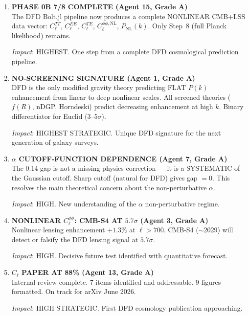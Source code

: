 \documentclass[11pt,a4paper]{article}
\begin{document}
\begin{enumerate}[label=\textbf{\arabic*.}, leftmargin=1.5cm]

\item \textbf{PHASE 0B 7/8 COMPLETE (Agent 15, Grade A)}\\
The DFD Bolt.jl pipeline now produces a complete NONLINEAR CMB+LSS data vector: $C_\ell^{TT}$, $C_\ell^{EE}$, $C_\ell^{TE}$, $C_\ell^{\phi\phi,\mathrm{NL}}$, $P_{\mathrm{NL}}(k)$. Only Step~8 (full Planck likelihood) remains.

\textit{Impact}: HIGHEST. One step from a complete DFD cosmological prediction pipeline.

\item \textbf{NO-SCREENING SIGNATURE (Agent 1, Grade A)}\\
DFD is the only modified gravity theory predicting FLAT $P(k)$ enhancement from linear to deep nonlinear scales. All screened theories ($f(R)$, nDGP, Horndeski) predict decreasing enhancement at high $k$. Binary differentiator for Euclid ($3$--$5\sigma$).

\textit{Impact}: HIGHEST STRATEGIC. Unique DFD signature for the next generation of galaxy surveys.

\item \textbf{$\alpha$ CUTOFF-FUNCTION DEPENDENCE (Agent 7, Grade A)}\\
The 0.14 gap is not a missing physics correction --- it is a SYSTEMATIC of the Gaussian cutoff. Sharp cutoff (natural for DFD) gives gap $= 0$. This resolves the main theoretical concern about the non-perturbative $\alpha$.

\textit{Impact}: HIGH. New understanding of the $\alpha$ non-perturbative regime.

\item \textbf{NONLINEAR $C_\ell^{\phi\phi}$: CMB-S4 AT $5.7\sigma$ (Agent 3, Grade A)}\\
Nonlinear lensing enhancement $+1.3\%$ at $\ell > 700$. CMB-S4 ($\sim$2029) will detect or falsify the DFD lensing signal at $5.7\sigma$.

\textit{Impact}: HIGH. Decisive future test identified with quantitative forecast.

\item \textbf{$C_\ell$ PAPER AT 88\% (Agent 13, Grade A)}\\
Internal review complete. 7 items identified and addressable. 9 figures formatted. On track for arXiv June 2026.

\textit{Impact}: HIGH STRATEGIC. First DFD cosmology publication approaching.


\end{enumerate}
\end{document}
